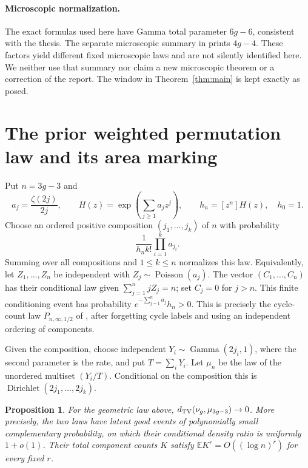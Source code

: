 \documentclass[11pt]{article}
\newtheorem{proposition}[theorem]{Proposition}
\theoremstyle{remark}\newtheorem{remark}[theorem]{Remark}
\newcommand{\E}{\mathbb E}\newcommand{\Prob}{\mathbb P}
\newcommand{\Poi}{\operatorname{Poisson}}\newcommand{\Gam}{\operatorname{Gamma}}
\newcommand{\Dir}{\operatorname{Dirichlet}}\newcommand{\PPP}{\operatorname{PPP}}
\begin{document}
\paragraph{Microscopic normalization.}
The exact formulas used here have Gamma total parameter $6g-6$, consistent with the thesis. The separate microscopic summary in \cite{OWR} prints $4g-4$. These factors yield different fixed microscopic laws and are not silently identified here. We neither use that summary nor claim a new microscopic theorem or a correction of the report. The window in Theorem~\ref{thm:main} is kept exactly as posed.

\section{The prior weighted permutation law and its area marking}

Put $n=3g-3$ and
\begin{equation}\label{eq:H}
 a_j=\frac{\zeta(2j)}{2j},\qquad H(z)=\exp\left(\sum_{j\ge1}a_jz^j\right),\qquad h_n=[z^n]H(z),\quad h_0=1.
\end{equation}
Choose an ordered positive composition $(j_1,\ldots,j_k)$ of $n$ with probability
\begin{equation}\label{eq:composition}
 \frac{1}{h_n k!}\prod_{i=1}^k a_{j_i}.
\end{equation}
Summing over all compositions and $1\le k\le n$ normalizes this law. Equivalently, let $Z_1,\ldots,Z_n$ be independent with $Z_j\sim\Poi(a_j)$. The vector $(C_1,\ldots,C_n)$ has their conditional law given $\sum_{j=1}^n jZ_j=n$; set $C_j=0$ for $j>n$. This finite conditioning event has probability $e^{-\sum_{j=1}^n a_j}h_n>0$. This is precisely the cycle-count law $P_{n,\infty,1/2}$ of \cite{DGZZ}, after forgetting cycle labels and using an independent ordering of components.

Given the composition, choose independent $Y_i\sim\Gam(2j_i,1)$, where the second parameter is the rate, and put $T=\sum_iY_i$. Let $\mu_n$ be the law of the unordered multiset $(Y_i/T)$. Conditional on the composition this is $\Dir(2j_1,\ldots,2j_k)$.

\begin{proposition}\label{prop:tv}
For the geometric law above, $d_{\mathrm{TV}}(\nu_g,\mu_{3g-3})\to0$. More precisely, the two laws have latent good events of polynomially small complementary probability, on which their conditional density ratio is uniformly $1+o(1)$. Their total component counts $K$ satisfy $\E K^r=O((\log n)^r)$ for every fixed $r$.
\end{proposition}
\end{document}
